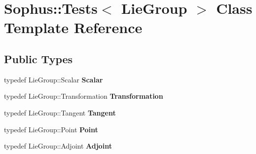 \hypertarget{class_sophus_1_1_tests}{}\section{Sophus\+:\+:Tests$<$ Lie\+Group $>$ Class Template Reference}
\label{class_sophus_1_1_tests}
\subsection*{Public Types}
\begin{DoxyCompactItemize}
\item 
typedef Lie\+Group\+::\+Scalar {\bfseries Scalar}\hypertarget{class_sophus_1_1_tests_af59d45a6ee78c8911bb7b4244eec9d86}{}\label{class_sophus_1_1_tests_af59d45a6ee78c8911bb7b4244eec9d86}

\item 
typedef Lie\+Group\+::\+Transformation {\bfseries Transformation}\hypertarget{class_sophus_1_1_tests_adc9997e7b1608b3061a0768bd967f6e3}{}\label{class_sophus_1_1_tests_adc9997e7b1608b3061a0768bd967f6e3}

\item 
typedef Lie\+Group\+::\+Tangent {\bfseries Tangent}\hypertarget{class_sophus_1_1_tests_aecfde8325b438503f13731e5082fdc67}{}\label{class_sophus_1_1_tests_aecfde8325b438503f13731e5082fdc67}

\item 
typedef Lie\+Group\+::\+Point {\bfseries Point}\hypertarget{class_sophus_1_1_tests_a51613730215d694f5c0ac97962131222}{}\label{class_sophus_1_1_tests_a51613730215d694f5c0ac97962131222}

\item 
typedef Lie\+Group\+::\+Adjoint {\bfseries Adjoint}\hypertarget{class_sophus_1_1_tests_aed4d7143d23352dbe8d453daf0316dde}{}\label{class_sophus_1_1_tests_aed4d7143d23352dbe8d453daf0316dde}

\end{DoxyCompactItemize}

